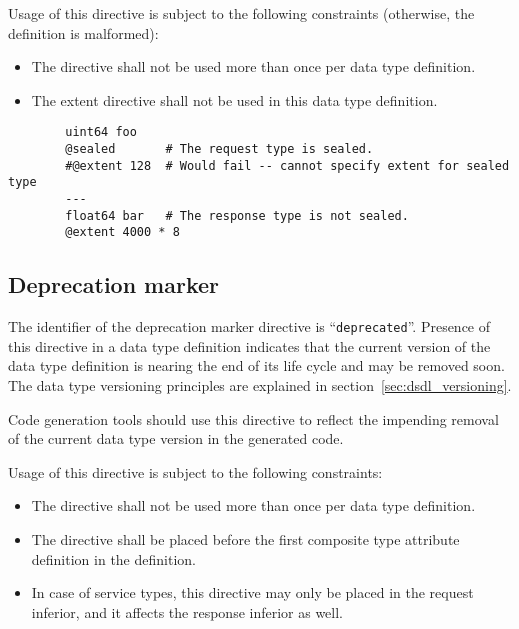 Usage of this directive is subject to the following constraints (otherwise, the definition is malformed):
\begin{itemize}
    \item The directive shall not be used more than once per data type definition.
    \item The extent directive shall not be used in this data type definition.
\end{itemize}

\begin{remark}
    \begin{verbatim}
        uint64 foo
        @sealed       # The request type is sealed.
        #@extent 128  # Would fail -- cannot specify extent for sealed type
        ---
        float64 bar   # The response type is not sealed.
        @extent 4000 * 8
    \end{verbatim}
\end{remark}

\subsection{Deprecation marker}

The identifier of the deprecation marker directive is ``\verb|deprecated|''.
Presence of this directive in a data type definition indicates that the current version of the data type definition
is nearing the end of its life cycle and may be removed soon.
The data type versioning principles are explained in section~\ref{sec:dsdl_versioning}.

Code generation tools should use this directive to reflect the impending removal of the current data type version
in the generated code.

Usage of this directive is subject to the following constraints:
\begin{itemize}
    \item The directive shall not be used more than once per data type definition.
    \item The directive shall be placed before the first composite type attribute definition in the definition.
    \item In case of service types, this directive may only be placed in the request inferior,
    and it affects the response inferior as well.
\end{itemize}

